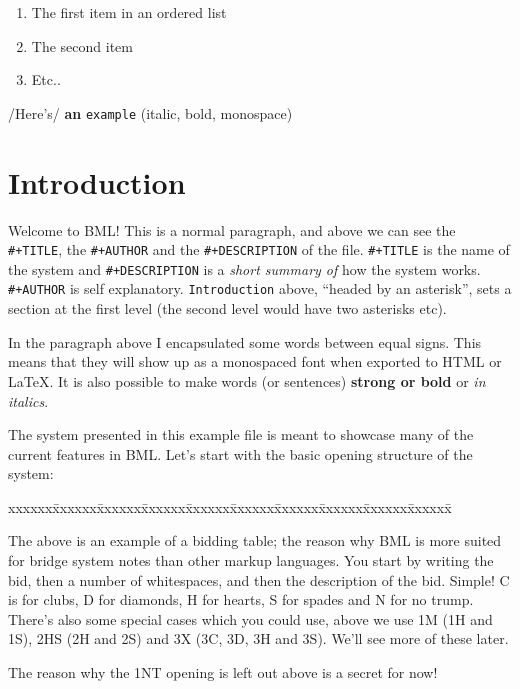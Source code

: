 \documentclass[a4paper]{article}
\newenvironment{bidtable}
{\begin{tabbing}

xxxxxx\=xxxxxx\=xxxxxx\=xxxxxx\=xxxxxx\=xxxxxx\=xxxxxx\=xxxxxx\=xxxxxx\=xxxxxx\=\kill}
{\end{tabbing} }%
\begin{document}
\begin{enumerate}
\item The first item in an ordered list

\item The second item

\item Etc..

\end{enumerate}

/Here's/ \textbf{an} \texttt{example} (italic, bold, monospace)

\section{Introduction}

Welcome to BML! This is a normal paragraph, and above we can see
the \texttt{\#+TITLE}, the \texttt{\#+AUTHOR} and the \texttt{\#+DESCRIPTION} of the file. \texttt{\#+TITLE} is
the name of the system and \texttt{\#+DESCRIPTION} is a \emph{short summary of} how
the system works. \texttt{\#+AUTHOR} is self explanatory. \texttt{Introduction} above,
``headed by an asterisk'', sets a section at the first level (the second
level would have two asterisks etc).

In the paragraph above I encapsulated some words between equal
signs. This means that they will show up as a monospaced font when
exported to HTML or LaTeX. It is also possible to make words (or
sentences) \textbf{strong or bold} or \emph{in italics}.

The system presented in this example file is meant to showcase many
of the current features in BML. Let's start with the basic opening
structure of the system:

\begin{bidtable}

\end{bidtable}

The above is an example of a bidding table; the reason why BML is
more suited for bridge system notes than other markup languages. You
start by writing the bid, then a number of whitespaces, and then the
description of the bid. Simple! C is for clubs, D for diamonds, H
for hearts, S for spades and N for no trump. There's also some
special cases which you could use, above we use 1M (1H and 1S), 2HS
(2H and 2S) and 3X (3C, 3D, 3H and 3S). We'll see more of these
later.

The reason why the 1NT opening is left out above is a secret for
now!
\end{document}
